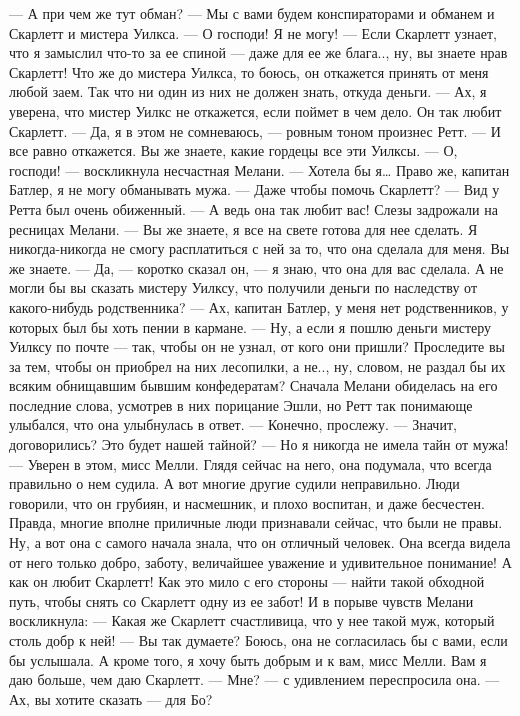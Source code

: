 — А при чем же тут обман?
— Мы с вами будем конспираторами и обманем и Скарлетт и мистера Уилкса.
— О господи! Я не могу!
— Если Скарлетт узнает, что я замыслил что-то за ее спиной — даже для ее же блага.., ну, вы знаете нрав Скарлетт! Что же до мистера Уилкса, то боюсь, он откажется принять от меня любой заем. Так что ни один из них не должен знать, откуда деньги.
— Ах, я уверена, что мистер Уилкс не откажется, если поймет в чем дело. Он так любит Скарлетт.
— Да, я в этом не сомневаюсь, — ровным тоном произнес Ретт. — И все равно откажется. Вы же знаете, какие гордецы все эти Уилксы.
— О, господи! — воскликнула несчастная Мелани. — Хотела бы я… Право же, капитан Батлер, я не могу обманывать мужа.
— Даже чтобы помочь Скарлетт? — Вид у Ретта был очень обиженный. — А ведь она так любит вас! Слезы задрожали на ресницах Мелани.
— Вы же знаете, я все на свете готова для нее сделать. Я никогда-никогда не смогу расплатиться с ней за то, что она сделала для меня. Вы же знаете.
— Да, — коротко сказал он, — я знаю, что она для вас сделала. А не могли бы вы сказать мистеру Уилксу, что получили деньги по наследству от какого-нибудь родственника?
— Ах, капитан Батлер, у меня нет родственников, у которых был бы хоть пении в кармане.
— Ну, а если я пошлю деньги мистеру Уилксу по почте — так, чтобы он не узнал, от кого они пришли? Проследите вы за тем, чтобы он приобрел на них лесопилки, а не.., ну, словом, не раздал бы их всяким обнищавшим бывшим конфедератам?
Сначала Мелани обиделась на его последние слова, усмотрев в них порицание Эшли, но Ретт так понимающе улыбался, что она улыбнулась в ответ.
— Конечно, прослежу.
— Значит, договорились? Это будет нашей тайной?
— Но я никогда не имела тайн от мужа!
— Уверен в этом, мисс Мелли.
Глядя сейчас на него, она подумала, что всегда правильно о нем судила. А вот многие другие судили неправильно. Люди говорили, что он грубиян, и насмешник, и плохо воспитан, и даже бесчестен. Правда, многие вполне приличные люди признавали сейчас, что были не правы. Ну, а вот она с самого начала знала, что он отличный человек. Она всегда видела от него только добро, заботу, величайшее уважение и удивительное понимание! А как он любит Скарлетт! Как это мило с его стороны — найти такой обходной путь, чтобы снять со Скарлетт одну из ее забот!
И в порыве чувств Мелани воскликнула:
— Какая же Скарлетт счастливица, что у нее такой муж, который столь добр к ней!
— Вы так думаете? Боюсь, она не согласилась бы с вами, если бы услышала. А кроме того, я хочу быть добрым и к вам, мисс Мелли. Вам я даю больше, чем даю Скарлетт.
— Мне? — с удивлением переспросила она. — Ах, вы хотите сказать — для Бо?
